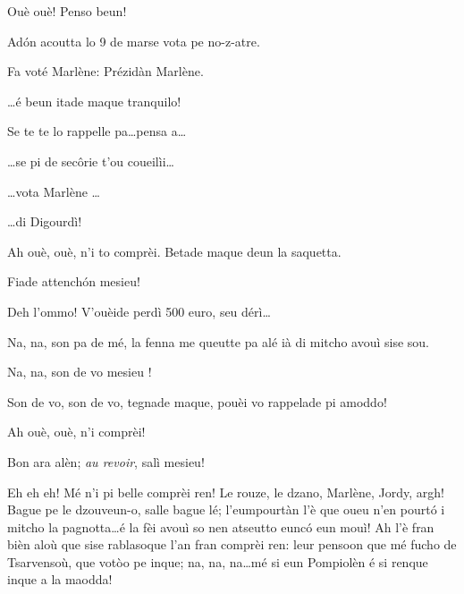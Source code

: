 \begin{drama}
\Pompiolenspeaks Ouè ouè! Penso beun!

\Dallasspeaks Ad\'on acoutta  lo 9 de marse vota pe no-z-atre.

\Joellespeaks Fa voté Marlène: Prézidàn Marlène.

\Pompiolenspeaks \ldots é beun itade maque tranquilo!

\Dallasspeaks Se te te lo rappelle pa\ldots pensa a\ldots

\Joellespeaks \ldots se pi de sec\^orie t'ou coueilìi\ldots

\Dallasspeaks \ldots vota Marlène \ldots

\Joellespeaks  \ldots di Digourdì!


\Pompiolenspeaks Ah ouè, ouè, n'i to comprèi. Betade maque deun la saquetta.


\Joellespeaks  Fiade attench\'on mesieu!

\Dallasspeaks Deh l'ommo! V'ouèide perdì 500 euro, seu dérì\ldots

\Pompiolenspeaks Na, na, son pa de mé, la fenna me queutte pa alé ià di mitcho avouì sise sou.

\Dallasspeaks Na, na, son de vo mesieu \ok !


\Dallasspeaks Son de vo, son de vo, tegnade maque, pouèi vo rappelade pi amoddo!

\Pompiolenspeaks {} Ah ouè, ouè, n'i comprèi!

\Joellespeaks Bon ara alèn; \textit{au revoir}, salì mesieu!


\Pompiolenspeaks {} Eh eh eh!  Mé n'i pi belle comprèi ren! Le rouze, le dzano, Marlène, Jordy, argh! Bague pe le dzouveun-o, salle bague lé; l'eumpourtàn l'è que oueu n'en pourt\'o i mitcho la pagnotta\ldots é la fèi avouì so nen atseutto eunc\'o eun mouì! Ah l'è fran bièn aloù que sise rablasoque l'an fran comprèi ren: leur pensoon que mé fucho de Tsarvensoù, que votòo pe inque; na, na, na\ldots mé si eun Pompiolèn é si renque inque a la maodda!


\end{drama}
